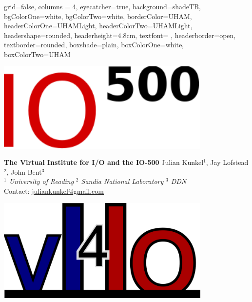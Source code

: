 \documentclass[portrait,a0paper,fontscale=0.4]{baposter}
\begin{document}



\begin{poster}
{ %
  grid=false,
  columns = 4,
  eyecatcher=true,
  background=shadeTB,%
  bgColorOne=white,
  bgColorTwo=white,
  borderColor=UHAM,
  headerColorOne=UHAMLight,
  headerColorTwo=UHAMLight,%
  headershape=rounded,
  headerheight=4.8cm,
  textfont={\setlength{\parindent}{0em} \setlength{\parskip}{0.75em}},
  headerborder=open,
  textborder=rounded,
  boxshade=plain,%
  boxColorOne=white,
  boxColorTwo=UHAM
}{ %
  \begin{minipage}{0.2\textwidth}
   \begin{center}
    \includegraphics[width=0.8\textwidth]{logo-io500.pdf}
   \end{center}
  \end{minipage}

}{ %
  \textbf{The Virtual Institute for I/O and the IO-500}
}{ %
  \vspace{0.5em}
  \textsc
  Julian Kunkel$^1$, Jay Lofstead$^2$, John Bent$^3$
  \\[0.5em]
  \emph{$^1$ University of Reading}
  \hspace*{2em}
  \emph{$^2$ Sandia National Laboratory}
   \hspace*{2em}
  \emph{$^3$ DDN}
  \\[0.5em]
   Contact: \url{juliankunkel@gmail.com}
}{
    \begin{minipage}{0.2\textwidth}
     \begin{center}
      \includegraphics[width=0.8\textwidth]{logo-vi4io.png}
     \end{center}
    \end{minipage}
}



\end{poster}
\end{document}
